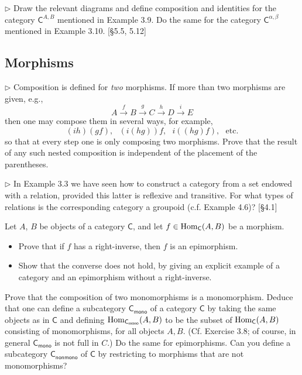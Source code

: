 \begin{problem}
  \def \C {\mathsf{C}}

  $\rhd$ Draw the relevant diagrams and define composition and identities for
  the category $\C^{A,B}$ mentioned in Example 3.9. Do the same for the
  category $\C^{\alpha,\beta}$ mentioned in Example 3.10. [\S5.5, 5.12]
\end{problem}

\subsection{Morphisms}


\begin{problem}
  $\rhd$ Composition is defined for \textit{two} morphisms. If more than two
  morphisms are given, e.g.,
  \[ A \xrightarrow{f} B \xrightarrow{g} C \xrightarrow{h} D \xrightarrow{i} E \]
  then one may compose them in several ways, for example,
  \[ (ih)(gf),\,\,\,\,(i(hg))f,\,\,\,\,i((hg)f),\,\,\,\,\text{etc.}\]
  so that at every step one is only composing two morphisms. Prove that the
  result of any such nested composition is independent of the placement of
  the parentheses.
\end{problem}

\begin{problem}
  $\rhd$ In Example 3.3 we have seen how to construct a category from a set
  endowed with a relation, provided this latter is reflexive and transitive.
  For what types of relations is the corresponding category a groupoid (c.f.
  Example 4.6)? [\S 4.1]
\end{problem}

\begin{problem}
  \def \C {\mathsf{C}}
  Let $A$, $B$ be objects of a category $\C$, and let $f \in \Hom_\C(A, B)$
  be a morphism.
  \begin{itemize}
    \item Prove that if $f$ has a right-inverse, then $f$ is an epimorphism.
    \item Show that the converse does not hold, by giving an explicit example
    of a category and an epimorphism without a right-inverse.
  \end{itemize}
\end{problem}

\begin{problem}
  \def \C {\mathsf{C}}
  \def \mono {\mathsf{mono}}
  \def \nonmono {\mathsf{nonmono}}

  Prove that the composition of two monomorphisms is a monomorphism. Deduce
  that one can define a subcategory $\C_\mono$ of a category $\C$ by taking
  the same objects as in $\C$ and defining $\Hom_{\C_\mono}(A, B)$ to be the
  subset of $\Hom_\C(A, B)$ consisting of monomorphisms, for all objects $A,
  B$. (Cf. Exercise 3.8; of course, in general $\C_\mono$ is not full in
  $C$.) Do the same for epimorphisms. Can you define a subcategory
  $\C_\nonmono$ of $\C$ by restricting to morphisms that are not
  monomorphisms?
\end{problem}

